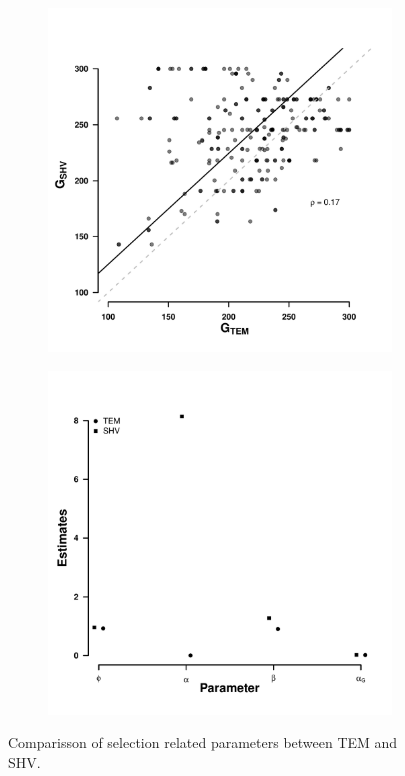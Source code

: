 \documentclass[12pt]{article}
\begin{document}
\begin{figure}[h]
    \centering
    \begin{subfigure}
        \centering
        \includegraphics[width=.45\textwidth]{img/g_shift_lac.pdf}
    \end{subfigure}
    \begin{subfigure}
        \centering
        \includegraphics[width=.45\textwidth]{img/TEM_SHV_2016_par_comp.pdf}
    \end{subfigure}
    \caption{Comparisson of selection related parameters between TEM and SHV.}
    \label{fig:tem_shv_param_comp}
\end{figure}
\end{document}
